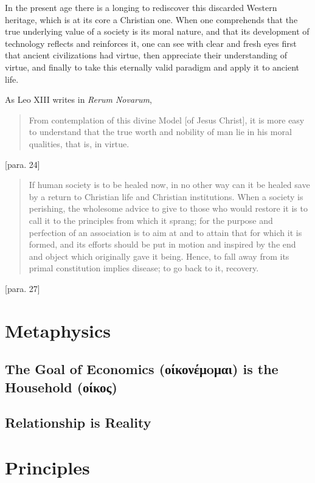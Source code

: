 \documentclass[10pt,letterpaper,openany]{book}
\begin{document}
In the present age there is a longing to rediscover this discarded Western heritage, which is at its core a Christian one. When one comprehends that the true underlying value of a society is its moral nature, and that its development of technology reflects and reinforces it, one can see with clear and fresh eyes first that ancient civilizations had virtue, then appreciate their understanding of virtue, and finally to take this eternally valid paradigm and apply it to ancient life.

As Leo XIII writes in \textit{Rerum Novarum},

\begin{quote}
  From contemplation of this divine Model [of Jesus Christ], it is more easy to understand that the true worth and nobility of man lie in his moral qualities, that is, in virtue.
\end{quote} [para. 24]

\begin{quote}
  If human society is to be healed now, in no other way can it be healed save by a return to Christian life and Christian institutions. When a society is perishing, the wholesome advice to give to those who would restore it is to call it to the principles from which it sprang; for the purpose and perfection of an association is to aim at and to attain that for which it is formed, and its efforts should be put in motion and inspired by the end and object which originally gave it being. Hence, to fall away from its primal constitution implies disease; to go back to it, recovery.
\end{quote} [para. 27]

\chapter{Metaphysics}

\section{The Goal of Economics (οίκονέμoμαι) is the Household (οίκος)}

\section{Relationship is Reality}

\chapter{Principles}
\end{document}
